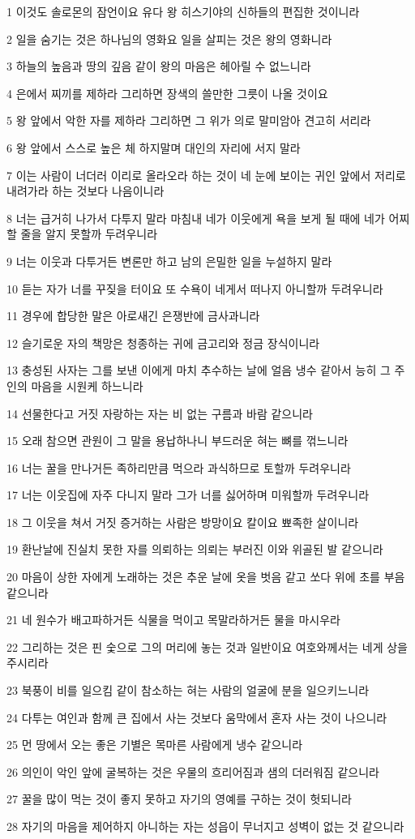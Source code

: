 \par 1 이것도 솔로몬의 잠언이요 유다 왕 히스기야의 신하들의 편집한 것이니라
\par 2 일을 숨기는 것은 하나님의 영화요 일을 살피는 것은 왕의 영화니라
\par 3 하늘의 높음과 땅의 깊음 같이 왕의 마음은 헤아릴 수 없느니라
\par 4 은에서 찌끼를 제하라 그리하면 장색의 쓸만한 그릇이 나올 것이요
\par 5 왕 앞에서 악한 자를 제하라 그리하면 그 위가 의로 말미암아 견고히 서리라
\par 6 왕 앞에서 스스로 높은 체 하지말며 대인의 자리에 서지 말라
\par 7 이는 사람이 너더러 이리로 올라오라 하는 것이 네 눈에 보이는 귀인 앞에서 저리로 내려가라 하는 것보다 나음이니라
\par 8 너는 급거히 나가서 다투지 말라 마침내 네가 이웃에게 욕을 보게 될 때에 네가 어찌 할 줄을 알지 못할까 두려우니라
\par 9 너는 이웃과 다투거든 변론만 하고 남의 은밀한 일을 누설하지 말라
\par 10 듣는 자가 너를 꾸짖을 터이요 또 수욕이 네게서 떠나지 아니할까 두려우니라
\par 11 경우에 합당한 말은 아로새긴 은쟁반에 금사과니라
\par 12 슬기로운 자의 책망은 청종하는 귀에 금고리와 정금 장식이니라
\par 13 충성된 사자는 그를 보낸 이에게 마치 추수하는 날에 얼음 냉수 같아서 능히 그 주인의 마음을 시원케 하느니라
\par 14 선물한다고 거짓 자랑하는 자는 비 없는 구름과 바람 같으니라
\par 15 오래 참으면 관원이 그 말을 용납하나니 부드러운 혀는 뼈를 꺾느니라
\par 16 너는 꿀을 만나거든 족하리만큼 먹으라 과식하므로 토할까 두려우니라
\par 17 너는 이웃집에 자주 다니지 말라 그가 너를 싫어하며 미워할까 두려우니라
\par 18 그 이웃을 쳐서 거짓 증거하는 사람은 방망이요 칼이요 뾰족한 살이니라
\par 19 환난날에 진실치 못한 자를 의뢰하는 의뢰는 부러진 이와 위골된 발 같으니라
\par 20 마음이 상한 자에게 노래하는 것은 추운 날에 옷을 벗음 같고 쏘다 위에 초를 부음 같으니라
\par 21 네 원수가 배고파하거든 식물을 먹이고 목말라하거든 물을 마시우라
\par 22 그리하는 것은 핀 숯으로 그의 머리에 놓는 것과 일반이요 여호와께서는 네게 상을 주시리라
\par 23 북풍이 비를 일으킴 같이 참소하는 혀는 사람의 얼굴에 분을 일으키느니라
\par 24 다투는 여인과 함께 큰 집에서 사는 것보다 움막에서 혼자 사는 것이 나으니라
\par 25 먼 땅에서 오는 좋은 기별은 목마른 사람에게 냉수 같으니라
\par 26 의인이 악인 앞에 굴복하는 것은 우물의 흐리어짐과 샘의 더러워짐 같으니라
\par 27 꿀을 많이 먹는 것이 좋지 못하고 자기의 영예를 구하는 것이 헛되니라
\par 28 자기의 마음을 제어하지 아니하는 자는 성읍이 무너지고 성벽이 없는 것 같으니라

